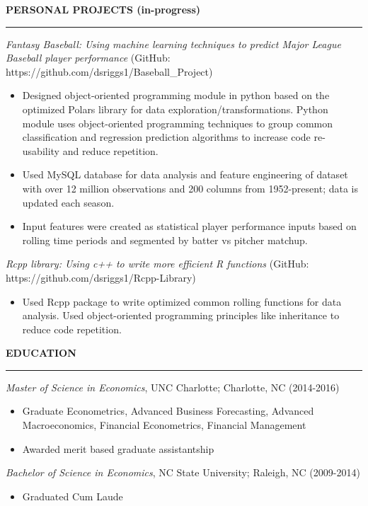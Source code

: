 \documentclass[a4paper,10pt]{article}
\begin{document}
\noindent
\textbf{PERSONAL PROJECTS (in-progress)}\vspace{-3mm}\\
\hrule height 2pt
\vspace{2mm}
\textit{Fantasy Baseball: Using machine learning techniques to predict Major League Baseball player performance} (GitHub: https://github.com/dsriggs1/Baseball\_Project)
\begin{itemize}
\item Designed object-oriented programming module in python based on the optimized Polars library for data exploration/transformations. Python module uses object-oriented programming techniques to group common classification and regression prediction algorithms to increase code re-usability and reduce repetition.
\item Used MySQL database for data analysis and feature engineering of dataset with over 12 million observations and 200 columns from 1952-present; data is updated each season.
\item Input features were created as statistical player performance inputs based on rolling time periods and segmented by batter vs pitcher matchup.
\end{itemize}

\noindent
\textit{Rcpp library: Using c++ to write more efficient R functions} (GitHub: https://github.com/dsriggs1/Rcpp-Library)
\begin{itemize}
\item Used Rcpp package to write optimized common rolling functions for data analysis. Used object-oriented programming principles like inheritance to reduce code repetition.
\end{itemize}

\noindent
\textbf{EDUCATION}\vspace{-3mm}\\
\hrule height 2pt
\vspace{2mm}
\textit{Master of Science in Economics}, UNC Charlotte; Charlotte, NC (2014-2016)
\begin{itemize}
\item Graduate Econometrics, Advanced Business Forecasting, Advanced Macroeconomics, Financial Econometrics, Financial Management 
\item Awarded merit based graduate assistantship
\end{itemize}

\noindent
\textit{Bachelor of Science in Economics}, NC State University; Raleigh, NC (2009-2014)
\begin{itemize}
\item Graduated Cum Laude
\end{itemize}
\end{document}
